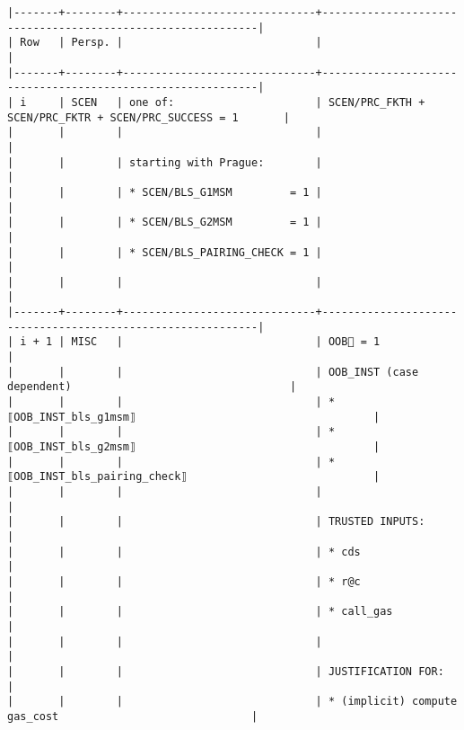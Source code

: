 \documentclass[varwidth=\maxdimen,margin=0.5cm,multi={verbatim}]{standalone}
\begin{document}
\begin{verbatim}
|-------+--------+------------------------------+------------------------------------------------------------|
| Row   | Persp. |                              |                                                            |
|-------+--------+------------------------------+------------------------------------------------------------|
| i     | SCEN   | one of:                      | SCEN/PRC_FKTH + SCEN/PRC_FKTR + SCEN/PRC_SUCCESS = 1       |
|       |        |                              |                                                            |
|       |        | starting with Prague:        |                                                            |
|       |        | * SCEN/BLS_G1MSM         = 1 |                                                            |
|       |        | * SCEN/BLS_G2MSM         = 1 |                                                            |
|       |        | * SCEN/BLS_PAIRING_CHECK = 1 |                                                            |
|       |        |                              |                                                            |
|-------+--------+------------------------------+------------------------------------------------------------|
| i + 1 | MISC   |                              | OOB🏴 = 1                                                  |
|       |        |                              | OOB_INST (case dependent)                                  |
|       |        |                              | * ⟦OOB_INST_bls_g1msm⟧                                     |
|       |        |                              | * ⟦OOB_INST_bls_g2msm⟧                                     |
|       |        |                              | * ⟦OOB_INST_bls_pairing_check⟧                             |
|       |        |                              |                                                            |
|       |        |                              | TRUSTED INPUTS:                                            |
|       |        |                              | * cds                                                      |
|       |        |                              | * r@c                                                      |
|       |        |                              | * call_gas                                                 |
|       |        |                              |                                                            |
|       |        |                              | JUSTIFICATION FOR:                                         |
|       |        |                              | * (implicit) compute gas_cost                              |

\end{verbatim}
\end{document}
